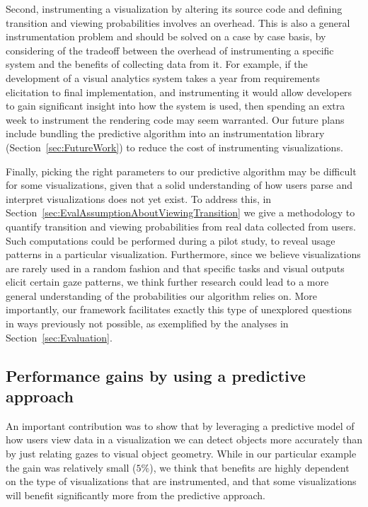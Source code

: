 Second, instrumenting a visualization by altering its source code and defining transition and viewing probabilities involves an overhead. This is also a general instrumentation problem and should be solved on a case by case basis, by considering of the tradeoff between the overhead of instrumenting a specific system and the benefits of collecting data from it. For example, if the development of a visual analytics system takes a year from requirements elicitation to final implementation, and instrumenting it would allow developers to gain significant insight into how the system is used, then spending an extra week to instrument the rendering code may seem warranted.  Our future plans include bundling the predictive algorithm into an instrumentation library (Section~\ref{sec:FutureWork})  to reduce the cost of instrumenting visualizations.   



Finally, picking the right parameters to our predictive algorithm may be difficult for some visualizations, given that a solid understanding of how users parse and interpret visualizations does not yet exist. To address this, in Section~\ref{sec:EvalAssumptionAboutViewingTransition}  we give a methodology to quantify transition and viewing probabilities from real data collected from users. Such computations could be performed during a pilot study, to reveal usage patterns in a particular visualization. Furthermore, since we believe visualizations are rarely used in a random fashion and that specific tasks and visual outputs elicit certain gaze patterns, we think further research could lead to a more general understanding of the probabilities our algorithm relies on.  More importantly, our framework facilitates exactly this type of unexplored questions in ways previously not possible, as exemplified by the analyses in Section~\ref{sec:Evaluation}. 
 

\subsection{Performance gains by using a predictive approach}
An important contribution was to show that by leveraging a predictive model of how users view data in a visualization we can detect objects more accurately than by just relating gazes to visual object geometry. While in our particular example the gain was relatively small ($5\%$), we think that benefits are highly dependent on the type of visualizations that are instrumented, and that some visualizations will benefit significantly more from the predictive approach. 

